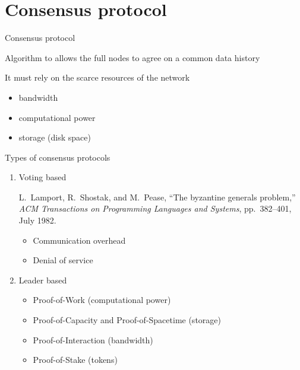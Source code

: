 \documentclass{beamer}
\begin{document}
\section{Consensus protocol}
\begin{frame}{Consensus protocol}
\begin{tcolorbox}[enhanced,drop shadow, title=Definition]
    Algorithm to allows the full nodes to agree on a common data history
\end{tcolorbox}
It must rely on the scarce resources of the network
\begin{itemize}
  \item bandwidth
  \item computational power
  \item storage (disk space)
\end{itemize}
\end{frame}
\begin{frame}{Types of consensus protocols}
\begin{enumerate}
  \item Voting based 
  \footnotesize
\begin{thebibliography}{1}

L.~Lamport, R.~Shostak, and M.~Pease, ``The byzantine generals problem,'' {\em
  ACM Transactions on Programming Languages and Systems}, pp.~382--401, July
  1982.

\end{thebibliography}
\normalsize
\begin{itemize}
  \item[\danger] Communication overhead
  \item[\danger] Denial of service
\end{itemize}

  \item Leader based
  \begin{itemize}
    \item Proof-of-Work (computational power)
    \item Proof-of-Capacity and Proof-of-Spacetime (storage)
    \item Proof-of-Interaction (bandwidth)
    \item Proof-of-Stake (tokens)
  \end{itemize}
\end{enumerate}
\end{frame}
\end{document}
